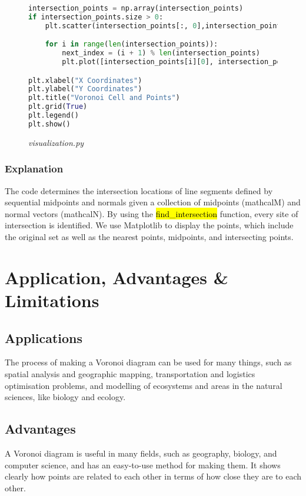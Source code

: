 \documentclass[12pt,a4paper]{report}
\begin{document}
\begin{figure}[ht!]
\centering
\caption{\large\textit{visualization.py}}
\begin{lstlisting}[language=Python, caption={Intersection Points Calculation and Visualization}]
intersection_points = np.array(intersection_points)
if intersection_points.size > 0:
    plt.scatter(intersection_points[:, 0],intersection_points[:, 1],color="purple",label="Intersections",)

    for i in range(len(intersection_points)):
        next_index = (i + 1) % len(intersection_points)
        plt.plot([intersection_points[i][0], intersection_points[next_index][0]],[intersection_points[i][1], intersection_points[next_index][1]], color="purple")

plt.xlabel("X Coordinates")
plt.ylabel("Y Coordinates")
plt.title("Voronoi Cell and Points")
plt.grid(True)
plt.legend()
plt.show()
\end{lstlisting}
\end{figure}


\vspace*{\fill}\newpage
\subsection*{Explanation}

The code determines the intersection locations of line segments defined by sequential midpoints and normals given a collection of midpoints (mathcalM) and normal vectors (mathcalN). By using the \hl{find\_intersection} function, every site of intersection is identified. We use Matplotlib to display the points, which include the original set as well as the nearest points, midpoints, and intersecting points.



\chapter{Application, Advantages \& Limitations}

\section{Applications}
The process of making a Voronoi diagram can be used for many things, such as spatial analysis and geographic mapping, transportation and logistics optimisation problems, and modelling of ecosystems and areas in the natural sciences, like biology and ecology.


\section{Advantages}
A Voronoi diagram is useful in many fields, such as geography, biology, and computer science, and has an easy-to-use method for making them. It shows clearly how points are related to each other in terms of how close they are to each other.
\end{document}

